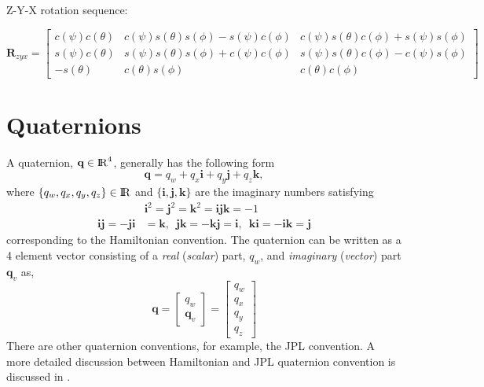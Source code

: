\documentclass{article}
\newcommand{\real}{{\rm I\!R}}
\renewcommand{\Vec}[1]{{\mathbf{#1}}}
\newcommand{\Mat}[1]{{\mathbf{#1}}}
\newcommand{\rot}{{\Mat{R}}}
\newcommand{\quat}{{\Vec{q}}}
\newcommand{\rot}{{\Mat{R}}}
\begin{document}
Z-Y-X rotation sequence:

\begin{equation}
  \rot_{zyx} =
  \begin{bmatrix}
    c(\psi) c(\theta)
    & c(\psi) s(\theta) s(\phi) - s(\psi) c(\phi)
    & c(\psi) s(\theta) c(\phi) + s(\psi) s(\phi) \\
    s(\psi) c(\theta)
    & s(\psi) s(\theta) s(\phi) + c(\psi) c(\phi)
    & s(\psi) s(\theta) c(\phi) - c(\psi) s(\phi) \\
    -s(\theta) & c(\theta) s(\phi) & c(\theta) c(\phi)
  \end{bmatrix}
\end{equation}



\newpage
\section{Quaternions}

A quaternion, $\Vec{q} \in \real^{4}$, generally has the following form
%
\begin{equation}
  \quat = q_{w} + q_{x} \mathbf{i} + q_{y} \mathbf{j} + q_{z} \mathbf{k},
\end{equation}
%
where $\{ q_{w}, q_{x}, q_{y}, q_{z} \} \in \real$ and $\{ \mathbf{i}, \mathbf{j},
\mathbf{k} \}$ are the imaginary numbers satisfying
%
\begin{equation}
\begin{split}
  &\mathbf{i}^{2}
  = \mathbf{j}^{2}
  = \mathbf{k}^{2}
  = \mathbf{ijk}
  = -1 \\
  \mathbf{ij} = -\mathbf{ji} &= \mathbf{k}, \enspace
  \mathbf{jk} = -\mathbf{kj} = \mathbf{i}, \enspace
  \mathbf{ki} = -\mathbf{ik} = \mathbf{j}
\end{split}
\end{equation}
%
corresponding to the Hamiltonian convention. The quaternion can be written as a
4 element vector consisting of a \textit{real} (\textit{scalar}) part, $q_{w}$,
and \textit{imaginary} (\textit{vector}) part $\quat_{v}$ as,
%
\begin{equation}
  \quat =
  \begin{bmatrix} q_{w} \\ \quat_{v} \end{bmatrix} =
  \begin{bmatrix} q_{w} \\ q_{x} \\ q_{y} \\ q_{z} \end{bmatrix}
\end{equation}
%
There are other quaternion conventions, for example, the JPL convention. A more
detailed discussion between Hamiltonian and JPL quaternion convention is
discussed in \cite{Sola2017}.
\end{document}
